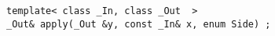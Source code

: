 {
\small
\begin{lstlisting}
template< class _In, class _Out  >
_Out& apply(_Out &y, const _In& x, enum Side) ;
\end{lstlisting}
}
